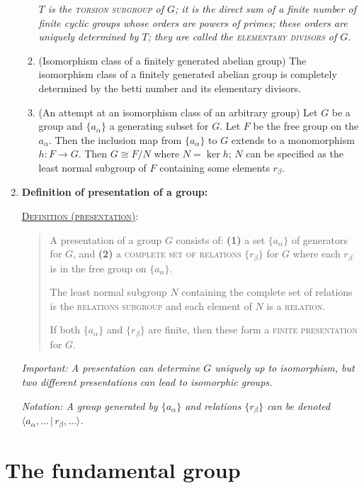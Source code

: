 \documentclass[letterpaper, 12pt]{book}
\newcommand{\defn}[2]{\textsc{\underline{Definition (#1)}:}\begin{quote} #2\end{quote}}
\begin{document}
\begin{enumerate}[resume]
\begin{enumerate}
        \textit{$T$ is the \textsc{torsion subgroup} of $G$; it is the direct sum of a finite number of finite cyclic groups whose orders are powers of primes; these orders are uniquely determined by $T$; they are called the \textsc{elementary divisors} of $G$.}
        \item (Isomorphism class of a finitely generated abelian group) The isomorphism class of a finitely generated abelian group is completely determined by the betti number and its elementary divisors.
        \item (An attempt at an isomorphism class of an arbitrary group) Let $G$ be a group and $\{a_\alpha\}$ a generating subset for $G$. Let $F$ be the free group on the $a_\alpha$. Then the inclusion map from $\{a_\alpha\}$ to $G$ extends to a monomorphism $h:F\to G$. Then $G\cong F/N$ where $N = \ker{h}$; $N$ can be specified as the least normal subgroup of $F$ containing some elements $r_\beta$.
        \end{enumerate}
    \item \textbf{Definition of presentation of a group:}

        \defn{presentation}{A presentation of a group $G$ consists of: \textbf{(1)} a set $\{a_\alpha\}$ of generators for $G$, and \textbf{(2)} a \textsc{complete set of relations} $\{r_\beta\}$ for $G$ where each $r_\beta$ is in the free group on $\{a_\alpha\}$.

        The least normal subgroup $N$ containing the complete set of relations is the \textsc{relations subgroup} and each element of $N$ is a \textsc{relation}.

        If both $\{a_\alpha\}$ and $\{r_\beta\}$ are finite, then these form a \textsc{finite presentation} for $G$.}

        \textit{Important: A presentation can determine $G$ uniquely up to isomorphism, but two different presentations can lead to isomorphic groups.}

        \textit{Notation: A group generated by $\{a_\alpha\}$ and relations $\{r_\beta\}$ can be denoted $\langle a_\alpha, \dots\,|\,r_\beta, \dots\rangle$.}
    \end{enumerate}

\chapter{The fundamental group}
\end{document}
